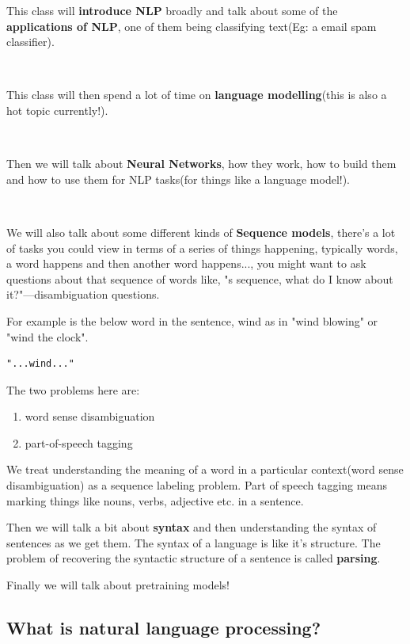 \documentclass[11pt]{article}
\begin{document}
This class will \textbf{introduce NLP} broadly and talk about some of the \textbf{applications of NLP}, one of them being classifying text(Eg: a email spam classifier). 

\

This class will then spend a lot of time on \textbf{language modelling}(this is also a hot topic currently!). 

\

Then we will talk about \textbf{Neural Networks}, how they work, how to build them and how to use them for NLP tasks(for things like a language model!).

\

We will also talk about some different kinds of \textbf{Sequence models}, there's a lot of tasks you could view in terms of a series of things happening, typically words, a word happens and then another word happens..., you might want to ask questions about that sequence of words like, "s sequence, what do I know about it?"---disambiguation questions.


For example is the below word in the sentence, wind as in "wind blowing" or "wind the clock".
\begin{center}
\begin{BVerbatim}
"...wind..."
\end{BVerbatim}
\end{center}


The two problems here are:
\begin{enumerate}
  \item word sense disambiguation
  \item part-of-speech tagging  
\end{enumerate}

We treat understanding the meaning of a word in a particular context(word sense disambiguation) as a sequence labeling problem. Part of speech tagging means marking things like nouns, verbs, adjective etc. in a sentence.


Then we will talk a bit about \textbf{syntax} and then understanding the syntax of sentences as we get them. The syntax of a language is like it's structure. The problem of recovering the syntactic structure of a sentence is called \textbf{parsing}.


Finally we will talk about pretraining models!

\subsection*{What is natural language processing?}
\end{document}
